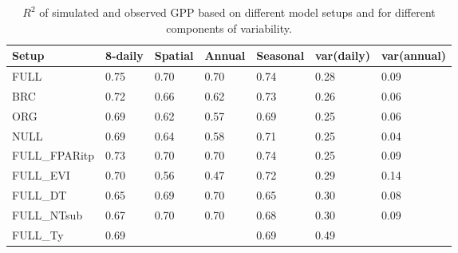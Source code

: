 \documentclass{myreport}
\begin{document}
\begin{table}
\centering
\begin{tabular}{lllllll}
  \toprule
  Setup & 8-daily & Spatial & Annual & Seasonal & var(daily) & var(annual) \\ 
  \midrule
  FULL & 0.75 & 0.70 & 0.70 & 0.74 & 0.28 & 0.09 \\ 
  BRC & 0.72 & 0.66 & 0.62 & 0.73 & 0.26 & 0.06 \\ 
  ORG & 0.69 & 0.62 & 0.57 & 0.69 & 0.25 & 0.06 \\ 
  NULL & 0.69 & 0.64 & 0.58 & 0.71 & 0.25 & 0.04 \\ 
  \midrule
  FULL\_FPARitp & 0.73 & 0.70 & 0.70 & 0.74 & 0.25 & 0.09 \\ 
  FULL\_EVI & 0.70 & 0.56 & 0.47 & 0.72 & 0.29 & 0.14 \\ 
  \midrule
  FULL\_DT & 0.65 & 0.69 & 0.70 & 0.65 & 0.30 & 0.08 \\ 
  FULL\_NTsub & 0.67 & 0.70 & 0.70 & 0.68 & 0.30 & 0.09 \\ 
  FULL\_Ty & 0.69 &  &  & 0.69 & 0.49 & \\ 
  \bottomrule
  \end{tabular}
\caption{$R^2$ of simulated and observed GPP based on different model setups and for different components of variability.} 
\label{tab:rsq}
\end{table}


\end{document}
